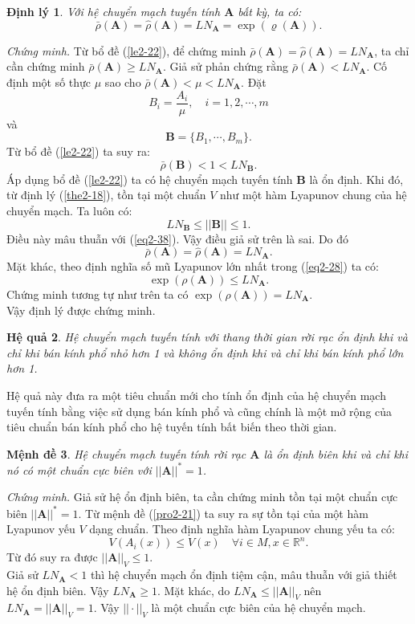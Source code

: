\documentclass[14pt,a4paper,oneside]{report}		%
\newtheorem{theorem}{Định lý}[chapter]
\newtheorem{proposition}[theorem]{Mệnh đề}
\newtheorem{corollary}[theorem]{Hệ quả}
\theoremstyle{definition}
\begin{document}
\begin{theorem} \label{the2-23}
Với hệ chuyển mạch tuyến tính $\mathbf{A}$ bất kỳ, ta có:
\begin{equation} \label{eq2-37}
\bar{\rho}(\mathbf{A})=\widehat{\rho}(\mathbf{A})=LN_\mathbf{A}=\exp(\varrho(\mathbf{A})).
\end{equation}
\end{theorem}
\textit{Chứng minh.} Từ bổ đề (\ref{le2-22}), để chứng minh $\bar{\rho}(\mathbf{A})=\widehat{\rho}(\mathbf{A})=LN_\mathbf{A}$, ta chỉ cần chứng minh $\bar{\rho}(\mathbf{A})\geq LN_\mathbf{A}$. Giả sử phản chứng rằng $\bar{\rho}(\mathbf{A})<LN_\mathbf{A}$. Cố định một số thực $\mu$ sao cho $\bar{\rho}(\mathbf{A})<\mu<LN_\mathbf{A}$. Đặt
$$B_i=\frac{A_i}{\mu}, \quad i=1,2,\cdots,m$$
và
$$\mathbf{B}=\{B_1,\cdots,B_m\}.$$
Từ bổ đề (\ref{le2-22}) ta suy ra:
\begin{equation} \label{eq2-38}
\bar{\rho}(\mathbf{B})<1<LN_\mathbf{B}.
\end{equation}
Áp dụng bổ đề (\ref{le2-22}) ta có hệ chuyển mạch tuyến tính $\mathbf{B}$ là ổn định. Khi đó, từ định lý (\ref{the2-18}), tồn tại một chuẩn $V$ như một hàm Lyapunov chung của hệ chuyển mạch. Ta luôn có:
$$LN_\mathbf{B}\leq||\mathbf{B}||\leq 1.$$
Điều này mâu thuẫn với (\ref{eq2-38}). Vậy điều giả sử trên là sai. Do đó
$$\bar{\rho}(\mathbf{A})=\widehat{\rho}(\mathbf{A})=LN_\mathbf{A}.$$
Mặt khác, theo định nghĩa số mũ Lyapunov lớn nhất trong (\ref{eq2-28}) ta có:
$$\exp(\rho(\mathbf{A}))\leq LN_\mathbf{A}.$$
Chứng minh tương tự như trên ta có $\exp(\rho(\mathbf{A}))=LN_\mathbf{A}$. \\
Vậy định lý được chứng minh.

\begin{corollary} \label{co2-24}
Hệ chuyển mạch tuyến tính với thang thời gian rời rạc ổn định khi và chỉ khi bán kính phổ nhỏ hơn 1 và không ổn định khi và chỉ khi bán kính phổ lớn hơn 1.
\end{corollary}

Hệ quả này đưa ra một tiêu chuẩn mới cho tính ổn định của hệ chuyển mạch tuyến tính bằng việc sử dụng bán kính phổ và cũng chính là một mở rộng của tiêu chuẩn bán kính phổ cho hệ tuyến tính bất biến theo thời gian.

\begin{proposition} \label{pro2-25}
Hệ chuyển mạch tuyến tính rời rạc $\mathbf{A}$ là ổn định biên khi và chỉ khi nó có một chuẩn cực biên với $||\mathbf{A}||^*=1$.
\end{proposition}
\textit{Chứng minh.} Giả sử hệ ổn định biên, ta cần chứng minh tồn tại một chuẩn cực biên $||\mathbf{A}||^*=1$. Từ mệnh đề (\ref{pro2-21}) ta suy ra sự tồn tại của một hàm Lyapunov yếu $V$ dạng chuẩn. Theo định nghĩa hàm Lyapunov chung yếu ta có:
$$V(A_i(x))\leq V(x)\quad\forall i\in M, x\in\mathbb{R}^n.$$
Từ đó suy ra được $||\mathbf{A}||_V\leq 1$.\\
Giả sử $LN_\mathbf{A}<1$ thì hệ chuyển mạch ổn định tiệm cận, mâu thuẫn với giả thiết hệ ổn định biên. Vậy $LN_\mathbf{A} \geq 1$. Mặt khác, do $LN_\mathbf{A}\leq ||\mathbf{A}||_V$ nên $LN_\mathbf{A}=||\mathbf{A}||_V=1$. Vậy $||\cdot||_V$ là một chuẩn cực biên của hệ chuyển mạch.\\
\end{document}
